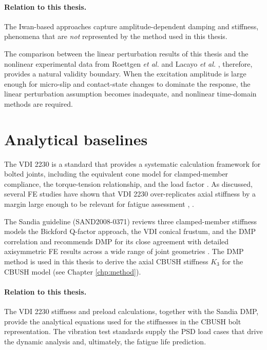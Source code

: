 \documentclass[a4paper,twoside]{bth}
\begin{document}

\paragraph{Relation to this thesis.}
The Iwan-based approaches capture amplitude-dependent damping and stiffness, phenomena that are \textit{not} represented by the method used in this thesis.

The comparison between the linear perturbation results of this thesis and the nonlinear experimental data from Roettgen \textit{et al.} and Lacayo \textit{et al.} \cite{15}, therefore, provides a natural validity boundary. When the excitation amplitude is large enough for micro-slip and contact-state changes to dominate the response, the linear perturbation assumption becomes inadequate, and nonlinear time-domain methods are required.

\section{Analytical baselines} \label{Analytical_Standards}
The VDI 2230 is a standard that provides a systematic calculation framework for bolted joints, including the equivalent cone model for clamped-member compliance, the torque-tension relationship, and the load factor \cite{VDI}. As discussed, several \ac{FE} studies have shown that VDI 2230 over-replicates axial stiffness by a margin large enough to be relevant for fatigue assessment \cite{09}, \cite{ding_generalized_2025}.

The Sandia guideline (SAND2008-0371) reviews three clamped-member stiffness models the Bickford Q-factor approach, the VDI conical frustum, and the \ac{DMP} correlation and recommends DMP for its close agreement with detailed axisymmetric \ac{FE} results across a wide range of joint geometries \cite{Sandia}. The DMP method is used in this thesis to derive the axial CBUSH stiffness $K_3$ for the CBUSH model (see Chapter \ref{chp:method}).

\paragraph{Relation to this thesis.}
The VDI 2230 stiffness and preload calculations, together with the Sandia DMP, provide the analytical equations used for the stiffnesses in the CBUSH bolt representation. The vibration test standards supply the \ac{PSD} load cases that drive the dynamic analysis and, ultimately, the fatigue life prediction.
\end{document}
